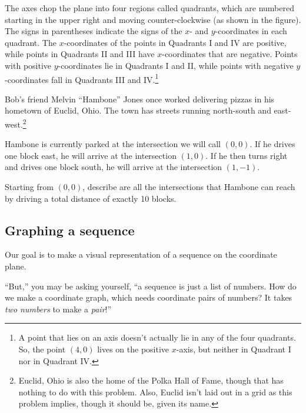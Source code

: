 The axes chop the plane into four regions called \glspl{quadrant}, which are numbered starting in the upper right and moving counter-clockwise (as shown in the figure). The signs in parentheses indicate the signs of the $x$- and $y$-coordinates in each quadrant. The $x$-coordinates of the points in Quadrants I and IV are positive, while points in Quadrants II and III have $x$-coordinates that are negative. Points with positive $y$-coordinates lie in Quadrants I and II, while points with negative $y$-coordinates fall in Quadrants III and IV.\footnote{A point that lies on an axis doesn't actually lie in any of the four quadrants. So, the point $(4, 0)$ lives on the positive $x$-axis, but neither in Quadrant I nor in Quadrant IV.}

\begin{boxexplore}
Bob's friend Melvin ``Hambone'' Jones once worked delivering pizzas in his hometown of Euclid, Ohio. The town has streets running north-south and east-west.\footnote{Euclid, Ohio is also the home of the Polka Hall of Fame, though that has nothing to do with this problem. Also, Euclid isn't laid out in a grid as this problem implies, though it should be, given its name.}

Hambone is currently parked at the intersection we will call $(0,0)$. If he drives one block east, he will arrive at the intersection $(1,0)$. If he then turns right and drives one block south, he will arrive at the intersection $(1,-1)$.

Starting from $(0,0)$, describe are all the intersections that Hambone can reach by driving a total distance of exactly 10 blocks.
\end{boxexplore}



\subsection{Graphing a sequence}

Our goal is to make a visual representation of a sequence on the coordinate plane.

``But,'' you may be asking yourself, ``a sequence is just a list of numbers. How do we make a coordinate graph, which needs coordinate pairs of numbers? It takes \textit{two numbers} to make a \textit{pair}!''

